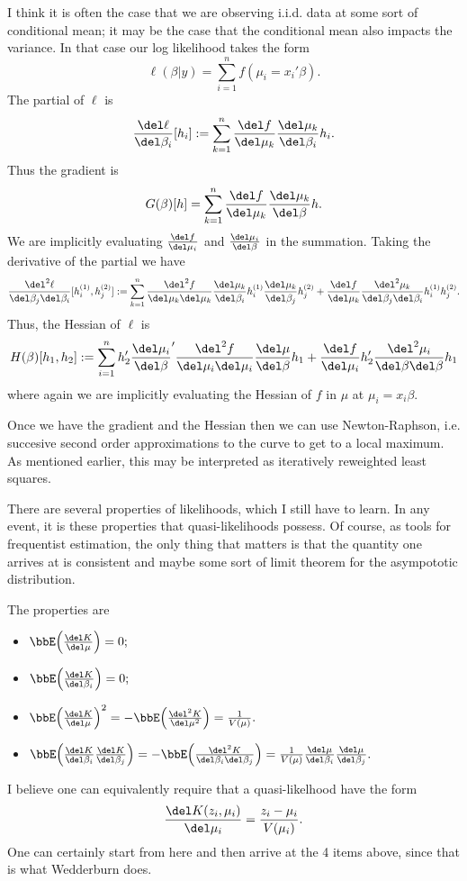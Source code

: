 \documentclass{article}
\newcommand{\graddel}[2]{\frac{\del #1}{\del #2}}
\newcommand{\hessdel}[3]{\frac{\del^2 #1}{\del #2 \del #3}}
\begin{document}
I think it is often the case that we are observing i.i.d. data at some sort of
conditional mean; it may be the case that the conditional mean also impacts the
variance.  In that case our log likelihood takes the form
\[
\ell(\beta | y) = \sum_{i=1}^n f(\mu_i = x_i' \beta).
\]
The partial of $\ell$ is
\[
\graddel{\ell}{\beta_i}[h_i]:= \sum_{k=1}^n \graddel{f}{\mu_k}
\graddel{\mu_k}{\beta_i} h_i.
\]
Thus the gradient is
\[
G(\beta)[h] = \sum_{k=1}^n \graddel{f}{\mu_k}
\graddel{\mu_k}{\beta} h.
\]
We are implicitly evaluating $\graddel{f}{\mu_i}$ and $\graddel{\mu_i}{\beta}$ in
the summation.  Taking the derivative of the partial we have
\[
\hessdel{\ell}{\beta_j}{\beta_i}[h_i^{(1)}, h_j^{(2)}]:= \sum_{k=1}^n
\hessdel{f}{\mu_k}{\mu_k} \graddel{\mu_k}{\beta_i} h_i^{(1)}
\graddel{\mu_k}{\beta_j} h_j^{(2)} + \graddel{f}{\mu_k}
\hessdel{\mu_k}{\beta_j}{\beta_i} h_i^{(1)} h_j^{(2)}.
\]
Thus, the Hessian of $\ell$ is
\[
H(\beta)[h_1, h_2] := 
\sum_{i=1}^n h_2' 
\graddel{\mu_i}{\beta}' \hessdel{f}{\mu_i}{\mu_i}\graddel{\mu}{\beta} h_1 
+ \graddel{f}{\mu_i} h_2' \hessdel{\mu_i}{\beta}{\beta} h_1
\]
where again we are implicitly evaluating the Hessian of $f$ in $\mu$ at $\mu_i =
x_i \beta$.

Once we have the gradient and the Hessian then we can use Newton-Raphson,
i.e. succesive second order approximations to the curve to get to a local
maximum.  As mentioned earlier, this may be interpreted as iteratively
reweighted least squares.  

There are several properties of likelihoods, which I still have to learn.  In
any event, it is these properties that quasi-likelihoods possess.  Of course, as
tools for frequentist estimation, the only thing that matters is that the
quantity one arrives at is consistent and maybe some sort of limit theorem for
the asympototic distribution.

The properties are
\begin{itemize}
\item 
  \(
  \bbE \Big( \graddel{K}{\mu} \Big) = 0;
  \)
  
\item
  \(
  \bbE \Big( \graddel{K}{\beta_i} \Big) = 0;
  \)

\item 
  \(
  \bbE \Big( \graddel{K}{\mu} \Big)^2 = - \bbE \Big( \frac{\del^2 K}{\del \mu^2}
  \Big) = \frac{1}{V(\mu)}.
  \)

\item 
  \(
  \bbE \Big( \graddel{K}{\beta_i} \graddel{K}{\beta_j} \Big)
  = - \bbE \Big( \hessdel{K}{\beta_i}{\beta_j} \Big) 
  = \frac{1}{V(\mu)} \graddel{\mu}{\beta_i} \graddel{\mu}{\beta_j}.
  \)
\end{itemize}
I believe one can equivalently require that a quasi-likelhood have the form
\[
\frac{\del K(z_i, \mu_i)}{\del \mu_i} = \frac{z_i - \mu_i}{V(\mu_i)}.
\]
One can certainly start from here and then arrive at the 4 items above, since
that is what Wedderburn does.
\end{document}
